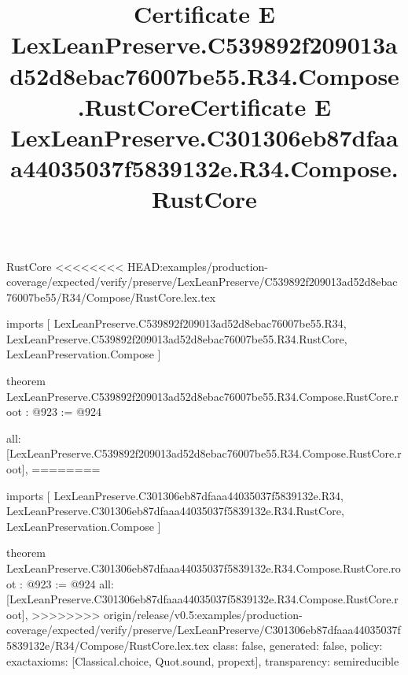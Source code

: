 \begin{lexlean}{RustCore}
<<<<<<<< HEAD:examples/production-coverage/expected/verify/preserve/LexLeanPreserve/C539892f209013ad52d8ebac76007be55/R34/Compose/RustCore.lex.tex
\title{Certificate E LexLeanPreserve.C539892f209013ad52d8ebac76007be55.R34.Compose.RustCore}
\begin{coremodule}
imports [
  LexLeanPreserve.C539892f209013ad52d8ebac76007be55.R34,
  LexLeanPreserve.C539892f209013ad52d8ebac76007be55.R34.RustCore,
  LexLeanPreservation.Compose
]

theorem LexLeanPreserve.C539892f209013ad52d8ebac76007be55.R34.Compose.RustCore.root : @923 := @924 {
  all: [LexLeanPreserve.C539892f209013ad52d8ebac76007be55.R34.Compose.RustCore.root],
========
\title{Certificate E LexLeanPreserve.C301306eb87dfaaa44035037f5839132e.R34.Compose.RustCore}
\begin{coremodule}
imports [
  LexLeanPreserve.C301306eb87dfaaa44035037f5839132e.R34,
  LexLeanPreserve.C301306eb87dfaaa44035037f5839132e.R34.RustCore,
  LexLeanPreservation.Compose
]

theorem LexLeanPreserve.C301306eb87dfaaa44035037f5839132e.R34.Compose.RustCore.root : @923 := @924 {
  all: [LexLeanPreserve.C301306eb87dfaaa44035037f5839132e.R34.Compose.RustCore.root],
>>>>>>>> origin/release/v0.5:examples/production-coverage/expected/verify/preserve/LexLeanPreserve/C301306eb87dfaaa44035037f5839132e/R34/Compose/RustCore.lex.tex
  class: false,
  generated: false,
  policy: exact{axioms: [Classical.choice, Quot.sound, propext]},
  transparency: semireducible
}


\end{coremodule}}
\end{coremodule}
\end{lexlean}
